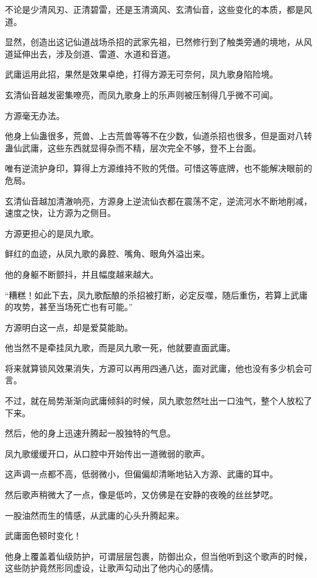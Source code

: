 
\begin{this_body}

不论是少清风刃、正清碧雷，还是玉清滴风、玄清仙音，这些变化的本质，都是风道。

显然，创造出这记仙道战场杀招的武家先祖，已然修行到了触类旁通的境地，从风道延伸出去，涉及剑道、雷道、水道和音道。

武庸运用此招，果然是效果卓绝，打得方源无可奈何，凤九歌身陷险境。

玄清仙音越发密集嘹亮，而凤九歌身上的乐声则被压制得几乎微不可闻。

方源毫无办法。

他身上仙蛊很多，荒兽、上古荒兽等等不在少数，仙道杀招也很多，但是面对八转蛊仙武庸，这些东西就显得杂而不精，层次完全不够，登不上台面。

唯有逆流护身印，算得上方源维持不败的凭借。可惜这等底牌，也不能解决眼前的危局。

玄清仙音越加清澈响亮，方源身上逆流仙衣都在震荡不定，逆流河水不断地削减，速度之快，让方源为之侧目。

方源更担心的是凤九歌。

鲜红的血迹，从凤九歌的鼻腔、嘴角、眼角外溢出来。

他的身躯不断颤抖，并且幅度越来越大。

“糟糕！如此下去，凤九歌酝酿的杀招被打断，必定反噬，随后重伤，若算上武庸的攻势，甚至当场死亡也有可能。”

方源明白这一点，却是爱莫能助。

他当然不是牵挂凤九歌，而是凤九歌一死，他就要直面武庸。

将来就算锁风效果消失，方源可以再用四通八达，面对武庸，他也没有多少机会可言。

不过，就在局势渐渐向武庸倾斜的时候，凤九歌忽然吐出一口浊气，整个人放松了下来。

然后，他的身上迅速升腾起一股独特的气息。

凤九歌缓缓开口，从口腔中开始传出一道微弱的歌声。

这声调一点都不高，低弱微小，但偏偏却清晰地钻入方源、武庸的耳中。

然后歌声稍微大了一点，像是低吟，又仿佛是在安静的夜晚的丝丝梦呓。

一股油然而生的情感，从武庸的心头升腾起来。

武庸面色顿时变化！

他身上覆盖着仙级防护，可谓层层包裹，防御出众，但当他听到这个歌声的时候，这些防护竟然形同虚设，让歌声勾动出了他内心的感情。


\end{this_body}
